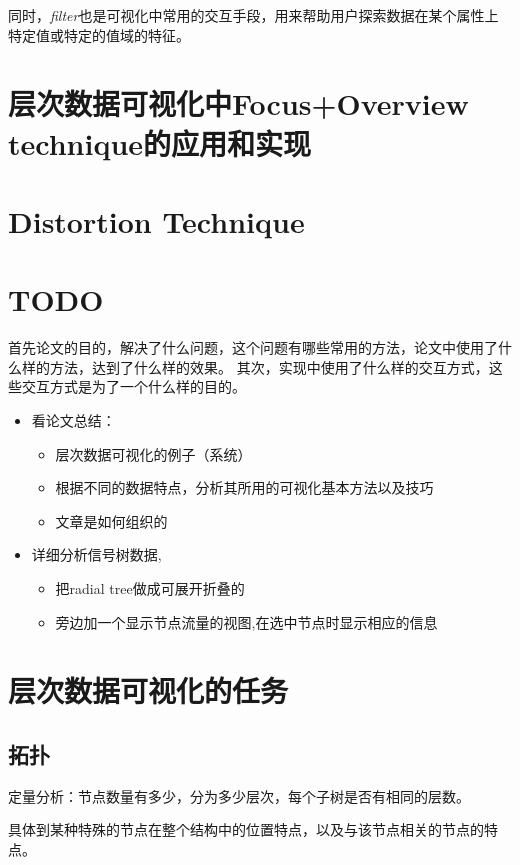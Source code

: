 \documentclass{article}
\begin{document}
同时，\emph{filter}也是可视化中常用的交互手段，用来帮助用户探索数据在某个属性上特定值或特定的值域的特征。


\section{层次数据可视化中Focus+Overview technique的应用和实现}

\section{Distortion Technique}

\section{TODO}

首先论文的目的，解决了什么问题，这个问题有哪些常用的方法，论文中使用了什么样的方法，达到了什么样的效果。
其次，实现中使用了什么样的交互方式，这些交互方式是为了一个什么样的目的。

\begin{itemize}
	\item 看论文总结：
		\begin{itemize}
			\item 层次数据可视化的例子（系统）
			\item 根据不同的数据特点，分析其所用的可视化基本方法以及技巧
			\item 文章是如何组织的
		\end{itemize}
	\item 详细分析信号树数据,
		\begin{itemize}
			\item 把radial tree做成可展开折叠的
			\item 旁边加一个显示节点流量的视图,在选中节点时显示相应的信息 
		\end{itemize}
\end{itemize}


\section{层次数据可视化的任务}

\subsection{拓扑}

定量分析：节点数量有多少，分为多少层次，每个子树是否有相同的层数。

具体到某种特殊的节点在整个结构中的位置特点，以及与该节点相关的节点的特点。
\end{document}
